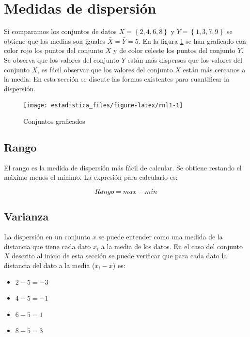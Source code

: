 \documentclass[]{book}
\providecommand{\tightlist}{%
  \setlength{\itemsep}{0pt}\setlength{\parskip}{0pt}}
\begin{document}
\hypertarget{dispersion}{%
\section{Medidas de dispersión}\label{dispersion}}

Si comparamos los conjuntos de datos \(X=\left\{ 2,4,6,8 \right\}\) y \(Y=\left\{1,3,7,9\right\}\) se obtiene que las medias son iguales \(\bar{X}= \bar{Y}=5\). En la figura \ref{fig:rnl1} se han graficado con color rojo los puntos del conjunto \(X\) y de color celeste los puntos del conjunto \(Y\). Se observa que los valores del conjunto \(Y\) están más dispersos que los valores del conjunto \(X\), es fácil observar que los valores del conjunto \(X\) están más cercanos a la media. En esta sección se discute las formas existentes para cuantificar la dispersión.

\begin{figure}[h!]

{\centering \texttt{[image: estadistica\_files/figure-latex/rnl1-1]} 

}

\caption{Conjuntos graficados}\label{fig:rnl1}
\end{figure}

\hypertarget{rango}{%
\subsection{Rango}\label{rango}}

El rango es la medida de dispersión más fácil de calcular. Se obtiene restando el máximo menos el mínimo. La expresión para calcularlo es:

\begin{equation} 
  Rango = max - min
  \label{eq:rg}
\end{equation}

\hypertarget{varianza}{%
\subsection{Varianza}\label{varianza}}

La dispersión en un conjunto \(x\) se puede entender como una medida de la distancia que tiene cada dato \(x_i\) a la media de los datos. En el caso del conjunto \(X\) descrito al inicio de esta sección se puede verificar que para cada dato la distancia del dato a la media (\(x_i-\bar{x}\)) es:

\begin{itemize}
\tightlist
\item
  \(2-5=-3\)
\item
  \(4-5=-1\)
\item
  \(6-5=1\)
\item
  \(8-5=3\)
\end{itemize}
\end{document}
